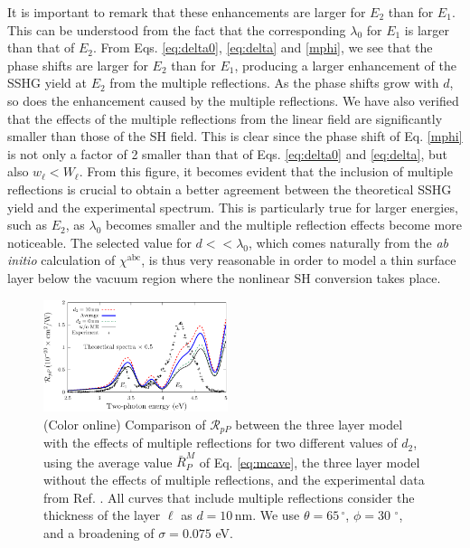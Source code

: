 \documentclass[aps,prb,10pt,showpacs,letterpaper,twocolumn]{revtex4-1}
\begin{document}
It is important to remark that these enhancements are larger for $E_{2}$ than
for $E_{1}$. This can be understood from the fact that the corresponding
$\lambda_{0}$ for $E_{1}$ is larger than that of $E_{2}$. From Eqs.
\eqref{eq:delta0}, \eqref{eq:delta} and \eqref{mphi}, we see that the phase
shifts are larger for $E_{2}$ than for $E_{1}$, producing a larger enhancement
of the SSHG yield at $E_{2}$ from the multiple reflections. As the phase shifts
grow with $d$, so does the enhancement caused by the multiple reflections. We
have also verified that the effects of the multiple reflections from the linear
field are significantly smaller than those of the SH field. This is clear since
the phase shift of Eq. \eqref{mphi} is not only a factor of 2 smaller than that
of Eqs. \eqref{eq:delta0} and \eqref{eq:delta}, but also $w_\ell < W_\ell$. From
this figure, it becomes evident that the inclusion of multiple reflections is
crucial to obtain a better agreement between the theoretical SSHG yield and the
experimental spectrum. This is particularly true for larger energies, such as
$E_{2}$, as $\lambda_{0}$ becomes smaller and the multiple reflection effects
become more noticeable. The selected value for $d << \lambda_{0}$, which comes
naturally from the \emph{ab initio} calculation of $\chi^{\mathrm{abc}}$, is
thus very reasonable in order to model a thin surface layer below the vacuum
region where the nonlinear SH conversion takes place.

\begin{figure}[t]
\includegraphics[width=0.48\textwidth]{fig3}
\caption{(Color online) Comparison of $\mathcal{R}_{pP}$ between the three layer
model with the effects of multiple reflections for two different values of
$d_{2}$, using the average value $\bar{R}^{M}_P$ of Eq. \eqref{eq:mcave}, the
three layer model without the effects of multiple reflections, and the
experimental data from Ref. . All curves that include
multiple reflections consider the thickness of the layer $\ell$ as $d =
10\,\mathrm{nm}$. We use $\theta = 65\,^{\circ}$, $\phi = 30\,\,^{\circ}$, and a
broadening of $\sigma = 0.075$ eV.}
\label{fig:d2values}
\end{figure}
\end{document}
